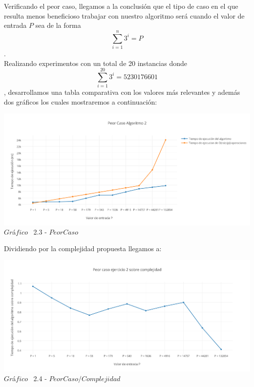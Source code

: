 Verificando el peor caso, llegamos a la conclusi\'on que el tipo de caso en el que resulta menos beneficioso trabajar con nuestro algoritmo ser\'a cuando el valor de entrada $P$ sea de la forma \[
\sum_{i=1}^{n}3^{i}=P 
\].
\\

Realizando experimentos con un total de 20 instancias donde \[
\sum_{i=1}^{20}3^{i}=5230176601 
\], desarrollamos una tabla comparativa con los valores m\'as relevantes y adem\'as dos gr\'aficos los cuales mostraremos a continuaci\'on: \\

\vspace*{0.3cm} \vspace*{0.3cm}
  \begin{center}
 \includegraphics[scale=0.65]{./EJ2/peorcaso.png}
 {$Gr$\'a$fico$ \ 2.3 - $Peor Caso$}
  \end{center}
  \vspace*{0.3cm}


Dividiendo por la complejidad propuesta llegamos a:\\

\vspace*{0.3cm} \vspace*{0.3cm}
  \begin{center}
 \includegraphics[scale=0.65]{./EJ2/peorcaso2.png}
 {$Gr$\'a$fico$ \ 2.4 - $Peor Caso / Complejidad$}
  \end{center}
  \vspace*{0.3cm}

